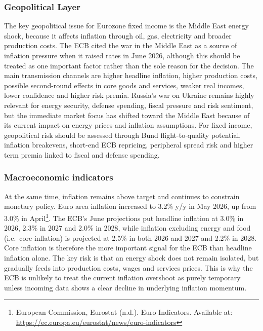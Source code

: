 \documentclass[11pt,a4paper]{article}
\begin{document}
\subsubsection{Geopolitical Layer}

The key geopolitical issue for Eurozone fixed income is the Middle East energy shock, because it affects inflation through oil, gas, electricity and broader production costs. The ECB cited the war in the Middle East as a source of inflation pressure when it raised rates in June 2026, although this should be treated as one important factor rather than the sole reason for the decision. The main transmission channels are higher headline inflation, higher production costs, possible second-round effects in core goods and services, weaker real incomes, lower confidence and higher risk premia. Russia's war on Ukraine remains highly relevant for energy security, defense spending, fiscal pressure and risk sentiment, but the immediate market focus has shifted toward the Middle East because of its current impact on energy prices and inflation assumptions. For fixed income, geopolitical risk should be assessed through Bund flight-to-quality potential, inflation breakevens, short-end ECB repricing, peripheral spread risk and higher term premia linked to fiscal and defense spending.

\subsubsection{Macroeconomic indicators}

At the same time, inflation remains above target and continues to constrain monetary policy. Euro area inflation increased to 3.2\% y/y in May 2026, up from 3.0\% in April\footnote{European Commission, Eurostat (n.d.). Euro Indicators. Available at: \url{https://ec.europa.eu/eurostat/news/euro-indicators}}. The ECB's June projections put headline inflation at 3.0\% in 2026, 2.3\% in 2027 and 2.0\% in 2028, while inflation excluding energy and food (i.e.\ core inflation) is projected at 2.5\% in both 2026 and 2027 and 2.2\% in 2028. Core inflation is therefore the more important signal for the ECB than headline inflation alone. The key risk is that an energy shock does not remain isolated, but gradually feeds into production costs, wages and services prices. This is why the ECB is unlikely to treat the current inflation overshoot as purely temporary unless incoming data shows a clear decline in underlying inflation momentum.

\end{document}
